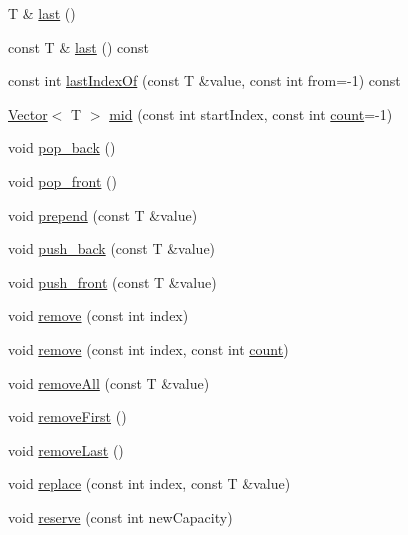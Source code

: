 \begin{DoxyCompactItemize}
\item 
T \& \hyperlink{classprism_1_1_vector_aa03291f774fc83f46972b07672fc616c}{last} ()
\item 
const T \& \hyperlink{classprism_1_1_vector_a8298d925eeb3a3be9e68d874112daf8c}{last} () const 
\item 
const int \hyperlink{classprism_1_1_vector_a33e965cfc15bd23e0748dfacaeb97428}{last\+Index\+Of} (const T \&value, const int from=-\/1) const 
\item 
\hyperlink{classprism_1_1_vector}{Vector}$<$ T $>$ \hyperlink{classprism_1_1_vector_ad15f2817fe441c22bbbdb1e1ecfe9aed}{mid} (const int start\+Index, const int \hyperlink{classprism_1_1_vector_ad40e1dc908502680797f37312dda7a4f}{count}=-\/1)
\item 
void \hyperlink{classprism_1_1_vector_a990628b9b119ddcec57715cd7541ea99}{pop\+\_\+back} ()
\item 
void \hyperlink{classprism_1_1_vector_abd9320b7ae720bb4c3500ebba3e42537}{pop\+\_\+front} ()
\item 
void \hyperlink{classprism_1_1_vector_a1438597636b56d6c9f522e719097190c}{prepend} (const T \&value)
\item 
void \hyperlink{classprism_1_1_vector_a4a920a4960f25c0aef5461eb46a2620e}{push\+\_\+back} (const T \&value)
\item 
void \hyperlink{classprism_1_1_vector_ad1f9542ba64a36ffbd10ede7cae95aef}{push\+\_\+front} (const T \&value)
\item 
void \hyperlink{classprism_1_1_vector_a5a1f891782e1bb2cba1bbe89a9b8afc7}{remove} (const int index)
\item 
void \hyperlink{classprism_1_1_vector_a2b9dcf29eefe01b99a83ec5c2189b487}{remove} (const int index, const int \hyperlink{classprism_1_1_vector_ad40e1dc908502680797f37312dda7a4f}{count})
\item 
void \hyperlink{classprism_1_1_vector_a9f44c797424ce88caf23a50486846b9d}{remove\+All} (const T \&value)
\item 
void \hyperlink{classprism_1_1_vector_a3a2287f445b6788a38a746b448f98b48}{remove\+First} ()
\item 
void \hyperlink{classprism_1_1_vector_a0d2d2724f9ba5a520159ddce1c9b4681}{remove\+Last} ()
\item 
void \hyperlink{classprism_1_1_vector_a6efd18c9c21f2a98f59ccea0ae2b694c}{replace} (const int index, const T \&value)
\item 
void \hyperlink{classprism_1_1_vector_a617fa4a86aca478131d33984c01118ae}{reserve} (const int new\+Capacity)

\end{DoxyCompactItemize}
